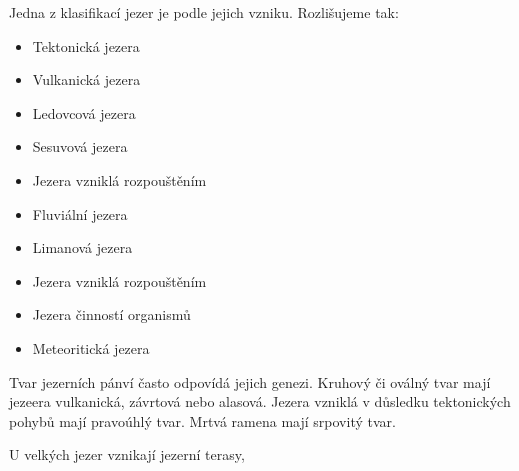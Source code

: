 Jedna z klasifikací jezer je podle jejich vzniku. Rozlišujeme tak:
\begin{itemize}
	\item Tektonická jezera	
	\item Vulkanická jezera
	\item Ledovcová jezera
	\item Sesuvová jezera
	\item Jezera vzniklá rozpouštěním
	\item Fluviální jezera
	\item Limanová jezera
	\item Jezera vzniklá rozpouštěním
	\item Jezera činností organismů
	\item Meteoritická jezera
\end{itemize}

Tvar jezerních pánví často odpovídá jejich genezi. Kruhový či oválný tvar mají jezeera vulkanická, závrtová nebo alasová. Jezera vzniklá v důsledku tektonických pohybů mají pravoúhlý tvar. Mrtvá ramena mají srpovitý tvar.


U velkých jezer vznikají jezerní terasy,







